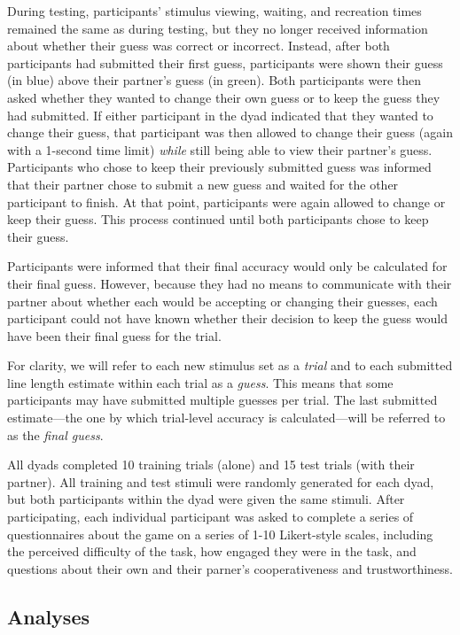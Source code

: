 \documentclass[10pt, letterpaper]{article}
\begin{document}
During testing, participants' stimulus viewing, waiting, and recreation
times remained the same as during testing, but they no longer received
information about whether their guess was correct or incorrect. Instead,
after both participants had submitted their first guess, participants
were shown their guess (in blue) above their partner's guess (in green).
Both participants were then asked whether they wanted to change their
own guess or to keep the guess they had submitted. If either participant
in the dyad indicated that they wanted to change their guess, that
participant was then allowed to change their guess (again with a
1-second time limit) \emph{while} still being able to view their
partner's guess. Participants who chose to keep their previously
submitted guess was informed that their partner chose to submit a new
guess and waited for the other participant to finish. At that point,
participants were again allowed to change or keep their guess. This
process continued until both participants chose to keep their guess.

Participants were informed that their final accuracy would only be
calculated for their final guess. However, because they had no means to
communicate with their partner about whether each would be accepting or
changing their guesses, each participant could not have known whether
their decision to keep the guess would have been their final guess for
the trial.

For clarity, we will refer to each new stimulus set as a \emph{trial}
and to each submitted line length estimate within each trial as a
\emph{guess}. This means that some participants may have submitted
multiple guesses per trial. The last submitted estimate---the one by
which trial-level accuracy is calculated---will be referred to as the
\emph{final guess}.

All dyads completed 10 training trials (alone) and 15 test trials (with
their partner). All training and test stimuli were randomly generated
for each dyad, but both participants within the dyad were given the same
stimuli. After participating, each individual participant was asked to
complete a series of questionnaires about the game on a series of 1-10
Likert-style scales, including the perceived difficulty of the task, how
engaged they were in the task, and questions about their own and their
parner's cooperativeness and trustworthiness.

\subsection{Analyses}\label{analyses}
\end{document}
